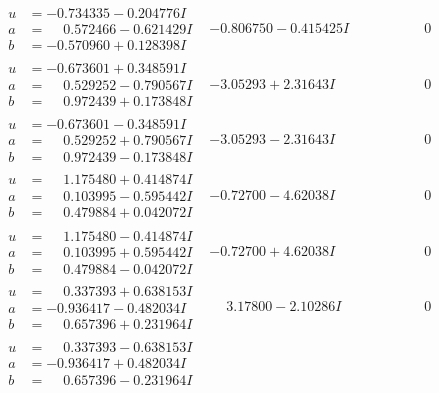 \documentclass[1p]{elsarticle_modified}
\theoremstyle{definition}
\begin{document}
$$\begin{array}{c|c|c}
\begin{aligned}
u &= -0.734335 - 0.204776 I \\
a &= \phantom{-}0.572466 - 0.621429 I \\
b &= -0.570960 + 0.128398 I\end{aligned}
 & -0.806750 - 0.415425 I & \phantom{-0.000000 } 0 \\ \hline\begin{aligned}
u &= -0.673601 + 0.348591 I \\
a &= \phantom{-}0.529252 - 0.790567 I \\
b &= \phantom{-}0.972439 + 0.173848 I\end{aligned}
 & -3.05293 + 2.31643 I & \phantom{-0.000000 } 0 \\ \hline\begin{aligned}
u &= -0.673601 - 0.348591 I \\
a &= \phantom{-}0.529252 + 0.790567 I \\
b &= \phantom{-}0.972439 - 0.173848 I\end{aligned}
 & -3.05293 - 2.31643 I & \phantom{-0.000000 } 0 \\ \hline\begin{aligned}
u &= \phantom{-}1.175480 + 0.414874 I \\
a &= \phantom{-}0.103995 - 0.595442 I \\
b &= \phantom{-}0.479884 + 0.042072 I\end{aligned}
 & -0.72700 - 4.62038 I & \phantom{-0.000000 } 0 \\ \hline\begin{aligned}
u &= \phantom{-}1.175480 - 0.414874 I \\
a &= \phantom{-}0.103995 + 0.595442 I \\
b &= \phantom{-}0.479884 - 0.042072 I\end{aligned}
 & -0.72700 + 4.62038 I & \phantom{-0.000000 } 0 \\ \hline\begin{aligned}
u &= \phantom{-}0.337393 + 0.638153 I \\
a &= -0.936417 - 0.482034 I \\
b &= \phantom{-}0.657396 + 0.231964 I\end{aligned}
 & \phantom{-}3.17800 - 2.10286 I & \phantom{-0.000000 } 0 \\ \hline\begin{aligned}
u &= \phantom{-}0.337393 - 0.638153 I \\
a &= -0.936417 + 0.482034 I \\
b &= \phantom{-}0.657396 - 0.231964 I\end{aligned}

\end{array}$$
\end{document}
